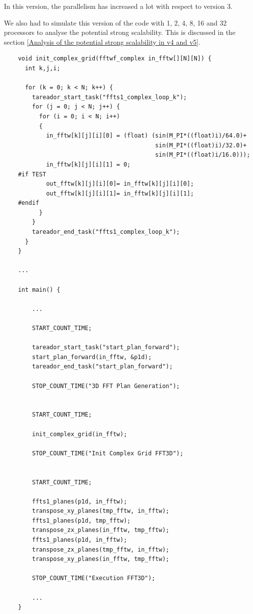 \documentclass[12pt, a4paper]{article}
\begin{document}
In this version, the parallelism has increased a lot with respect to version 3.

We also had to simulate this version of the code with 1, 2, 4, 8, 16 and 32 processors to analyse the potential strong scalability. This is discussed in the section \ref{Analysis of the potential strong scalability in v4 and v5}.

\begin{lstlisting}
	void init_complex_grid(fftwf_complex in_fftw[][N][N]) {
	  int k,j,i;
	
	  for (k = 0; k < N; k++) {
	    tareador_start_task("ffts1_complex_loop_k");
	    for (j = 0; j < N; j++) {
	      for (i = 0; i < N; i++)
	      {
	        in_fftw[k][j][i][0] = (float) (sin(M_PI*((float)i)/64.0)+
	        							   sin(M_PI*((float)i)/32.0)+
	        							   sin(M_PI*((float)i/16.0)));
	        in_fftw[k][j][i][1] = 0;
	#if TEST
	        out_fftw[k][j][i][0]= in_fftw[k][j][i][0];
	        out_fftw[k][j][i][1]= in_fftw[k][j][i][1];
	#endif
	      }
	    }
	    tareador_end_task("ffts1_complex_loop_k");
	  }
	}
	
	...
	
	int main() {
	
		...
		
		START_COUNT_TIME;
	
	    tareador_start_task("start_plan_forward");
	    start_plan_forward(in_fftw, &p1d);
	    tareador_end_task("start_plan_forward");
	
	    STOP_COUNT_TIME("3D FFT Plan Generation");
	
	
	    START_COUNT_TIME;
	
	    init_complex_grid(in_fftw);
	
	    STOP_COUNT_TIME("Init Complex Grid FFT3D");
	
	
	    START_COUNT_TIME;
	
	    ffts1_planes(p1d, in_fftw);
	    transpose_xy_planes(tmp_fftw, in_fftw);
	    ffts1_planes(p1d, tmp_fftw);
	    transpose_zx_planes(in_fftw, tmp_fftw);
	    ffts1_planes(p1d, in_fftw);
	    transpose_zx_planes(tmp_fftw, in_fftw);
	    transpose_xy_planes(in_fftw, tmp_fftw);
	     
	    STOP_COUNT_TIME("Execution FFT3D");
	    
	    ...
	}
\end{lstlisting}
\end{document}
